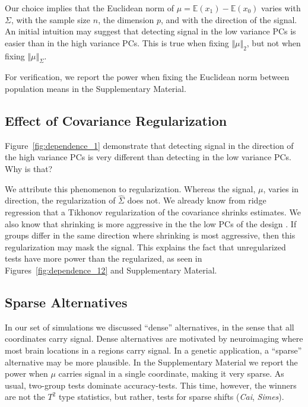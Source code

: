 \documentclass[]{bio}
\begin{document}
Our choice implies that the Euclidean norm of $\mu=\mathbb{E}(x_1)-\mathbb{E}(x_0)$ varies with $\Sigma$, with the sample size $n$, the dimension $p$, and with the direction of the signal.
An initial intuition may suggest that detecting signal in the low variance PCs is easier than in the high variance PCs. 
This is true when fixing $\Vert \mu \Vert_2$, but not when fixing $\Vert \mu \Vert_{\Sigma}$.

For verification, we report the power when fixing the Euclidean norm between population means in the Supplementary Material.



\subsection{Effect of Covariance Regularization}
\label{sec:regularizaton}

Figure~\ref{fig:dependence_1} demonstrate that detecting signal in the direction of the high variance PCs is very different than detecting in the low variance PCs.
Why is that?

We attribute this phenomenon to regularization.
Whereas the signal, $\mu$, varies in direction, the regularization of $\hat \Sigma$ does not. 
We already know from ridge regression that a Tikhonov regularization of the covariance shrinks estimates. 
We also know that shrinking is more aggressive in the the low PCs of the design \citep{hastie_elements_2003}. 
If groups differ in the same direction where shrinking is most aggressive, then this regularization may mask the signal. 
This explains the fact that unregularized tests have more power than the regularized, as seen in Figures~\ref{fig:dependence_12} and Supplementary Material.


\subsection{Sparse Alternatives}
\label{sec:sparse}
In our set of simulations we discussed ``dense'' alternatives, in the sense that all coordinates carry signal.
Dense alternatives are motivated by neuroimaging where most brain locations in a regions carry signal.
In a genetic application, a ``sparse'' alternative may be more plausible. 
In the Supplementary Material we report the power when $\mu$ carries signal in a single coordinate, making it very sparse. 
As usual, two-group tests dominate accuracy-tests.
This time, however, the winners are not the $T^2$ type statistics, but rather, tests for sparse shifts (\emph{Cai}, \emph{Simes}).
\end{document}
